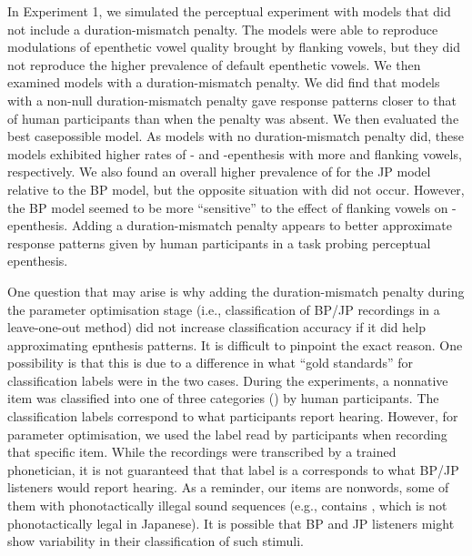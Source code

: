 In Experiment 1, we simulated the perceptual experiment with models that did not include a duration-mismatch penalty. The models were able to reproduce modulations of epenthetic vowel quality brought by flanking vowels, but they did not reproduce the higher prevalence of default epenthetic vowels.
We then examined models with a duration-mismatch penalty. We did find that models with a non-null duration-mismatch penalty gave response patterns closer to that of human participants than when the penalty was absent. We then evaluated the best casepossible model. As models with no duration-mismatch penalty did, these models exhibited higher rates of - and -epenthesis with more  and  flanking vowels, respectively. We also found an overall higher prevalence of  for the JP model relative to the BP model, but the opposite situation with  did not occur. However, the BP model seemed to be more ``sensitive'' to the effect of  flanking vowels on -epenthesis. Adding a duration-mismatch penalty appears to better approximate response patterns given by human participants in a task probing perceptual epenthesis.  

One question that may arise is why adding the duration-mismatch penalty during the parameter optimisation stage (i.e., classification of BP/JP recordings in a leave-one-out method) did not increase classification accuracy if it did help approximating epnthesis patterns. It is difficult to pinpoint the exact reason. One possibility is that this is due to a difference in what ``gold standards'' for classification labels were in the two cases. During the experiments, a nonnative item was classified into one of three categories () by human participants. The classification labels correspond to what participants report hearing. However, for parameter optimisation, we used the label read by participants when recording that specific item. While the recordings were transcribed by a trained phonetician, it is not guaranteed that that label is a corresponds to what BP/JP listeners would report hearing. As a reminder, our items are nonwords, some of them with phonotactically illegal sound sequences (e.g.,  contains , which is not phonotactically legal in Japanese). It is possible that BP and JP listeners might show variability in their classification of such stimuli.    

